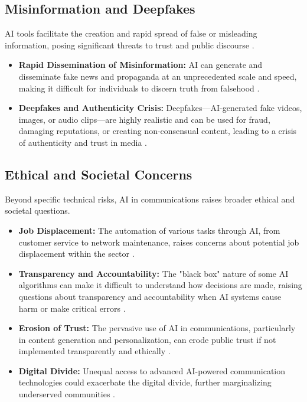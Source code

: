 \subsection{Misinformation and Deepfakes}
AI tools facilitate the creation and rapid spread of false or misleading information, posing significant threats to trust and public discourse \cite{PRSA_Misinformation}.
\begin{itemize}
    \item \textbf{Rapid Dissemination of Misinformation:} AI can generate and disseminate fake news and propaganda at an unprecedented scale and speed, making it difficult for individuals to discern truth from falsehood \cite{Brookings_Misinformation}.
    \item \textbf{Deepfakes and Authenticity Crisis:} Deepfakes—AI-generated fake videos, images, or audio clips—are highly realistic and can be used for fraud, damaging reputations, or creating non-consensual content, leading to a crisis of authenticity and trust in media \cite{VirginMedia_Deepfakes, Mishcon_Deepfakes}.
\end{itemize}

\subsection{Ethical and Societal Concerns}
Beyond specific technical risks, AI in communications raises broader ethical and societal questions.
\begin{itemize}
    \item \textbf{Job Displacement:} The automation of various tasks through AI, from customer service to network maintenance, raises concerns about potential job displacement within the sector \cite{AgilityPR_Ethical}.
    \item \textbf{Transparency and Accountability:} The "black box" nature of some AI algorithms can make it difficult to understand how decisions are made, raising questions about transparency and accountability when AI systems cause harm or make critical errors \cite{CloudContactAI_Ethical}.
    \item \textbf{Erosion of Trust:} The pervasive use of AI in communications, particularly in content generation and personalization, can erode public trust if not implemented transparently and ethically \cite{ResearchGate_Ethical}.
\item \textbf{Digital Divide:} Unequal access to advanced AI-powered communication technologies could exacerbate the digital divide, further marginalizing underserved communities \cite{Digitopia_DigitalDivide}.
\end{itemize}

